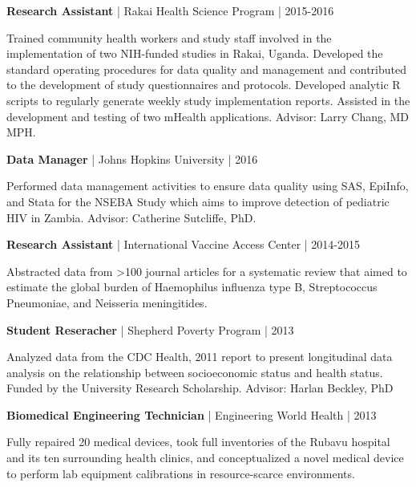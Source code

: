 \documentclass[10pt]{article}
\newcommand{\halfblankline}{\quad\vspace{-0.5\baselineskip}\pagebreak[3]}
\begin{document}
\halfblankline

\textbf{Research Assistant} | Rakai Health Science Program | 2015-2016
\begin{innerlist}
    \item Trained community health workers and study staff involved
    in the implementation of two NIH-funded studies in Rakai, Uganda.
    Developed the standard operating procedures for data quality
    and management and contributed to the development of study
    questionnaires and protocols. Developed analytic R scripts to
    regularly generate weekly study implementation reports.
    Assisted in the development and testing of two mHealth applications.
    Advisor: Larry Chang, MD MPH.
\end{innerlist}

\halfblankline

\textbf{Data Manager} | Johns Hopkins University | 2016
\begin{innerlist}
    \item Performed data management activities to ensure data quality
    using SAS, EpiInfo, and Stata for the NSEBA Study which aims to
    improve detection of pediatric HIV in Zambia. Advisor: Catherine
    Sutcliffe, PhD.
\end{innerlist}

\halfblankline

\textbf{Research Assistant} | International Vaccine Access Center | 2014-2015
\begin{innerlist}
    \item	Abstracted data from >100 journal articles for a
    systematic review that aimed to estimate the
    global burden of Haemophilus influenza type B,
    Streptococcus Pneumoniae, and Neisseria meningitides.
\end{innerlist}

\halfblankline


\textbf{Student Reseracher} | Shepherd Poverty Program | 2013
\begin{innerlist}
    \item Analyzed data from the CDC Health, 2011 report to present
    longitudinal data analysis on the relationship between
    socioeconomic status and health status. Funded by the University
    Research Scholarship. Advisor: Harlan Beckley, PhD
\end{innerlist}

\halfblankline

\textbf{Biomedical Engineering Technician} | Engineering World Health | 2013
\begin{innerlist}
    \item Fully repaired 20 medical devices, took full inventories of the
    Rubavu hospital and its ten surrounding health clinics, and
    conceptualized a novel medical device to perform lab equipment
    calibrations in resource-scarce environments.
\end{innerlist}
\end{document}

